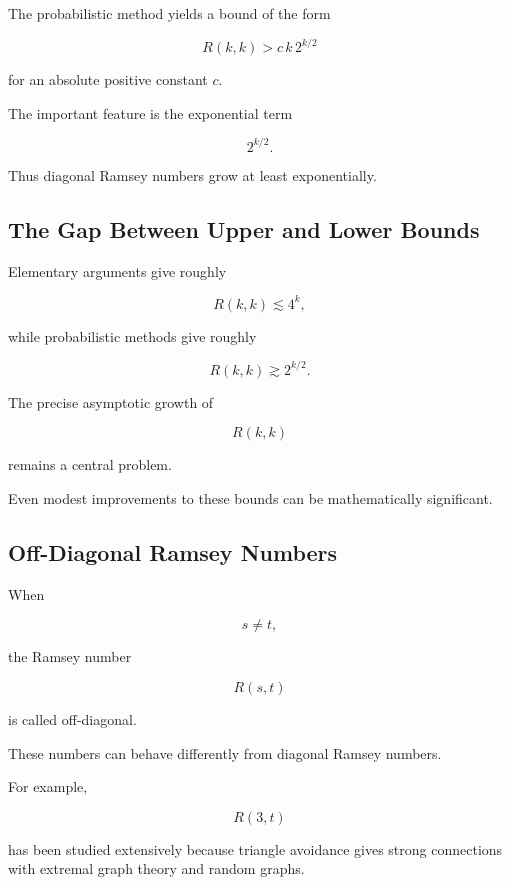 The probabilistic method yields a bound of the form

\[
\boxed{
R(k,k)
>
c\,k\,2^{k/2}
}
\]

for an absolute positive constant \(c\).

The important feature is the exponential term

\[
2^{k/2}.
\]

Thus diagonal Ramsey numbers grow at least exponentially.

\subsection{The Gap Between Upper and Lower Bounds}
\label{subsec:ramsey-gap}

Elementary arguments give roughly

\[
R(k,k)
\lesssim
4^k,
\]

while probabilistic methods give roughly

\[
R(k,k)
\gtrsim
2^{k/2}.
\]

The precise asymptotic growth of

\[
R(k,k)
\]

remains a central problem.

Even modest improvements to these bounds can be mathematically
significant.

\subsection{Off-Diagonal Ramsey Numbers}
\label{subsec:off-diagonal-ramsey}

When

\[
s\neq t,
\]

the Ramsey number

\[
R(s,t)
\]

is called off-diagonal.

These numbers can behave differently from diagonal Ramsey numbers.

For example,

\[
R(3,t)
\]

has been studied extensively because triangle avoidance gives strong
connections with extremal graph theory and random graphs.

